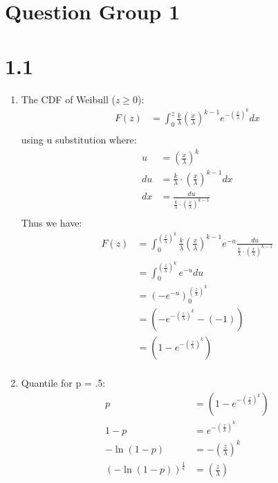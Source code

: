 \documentclass{article}
\title{\thetitle}
\author{\theauthor}
\begin{document}
\maketitle

\section*{Question Group 1}
\section*{1.1}
\begin{enumerate}
\item The CDF of Weibull ($z \geq 0$): \\
\begin{align*}
F(z) &= \int_0^{z}\frac{k}{\lambda} (\frac{x}{\lambda})^{k-1}e^{-(\frac{x}{\lambda})^k} dx\\
\end{align*}
using u substitution where: 
\begin{align*}
u &= (\frac{x}{\lambda})^k \\
du &= \frac{k}{\lambda} \cdot (\frac{x}{\lambda})^{k-1}dx \\
dx &= \frac{du}{\frac{k}{\lambda} \cdot (\frac{x}{\lambda})^{k-1}} \\
\end{align*}
Thus we have: \\
\begin{align*}
F(z) &= \int_0^{(\frac{z}{\lambda})^k}\frac{k}{\lambda} (\frac{x}{\lambda})^{k-1}e^{-u}  \frac{du}{\frac{k}{\lambda} \cdot (\frac{x}{\lambda})^{k-1}}\\
&= \int_0^{ (\frac{z}{\lambda})^k} e^{-u} du \\
&= (-e^{-u})_0^{ (\frac{z}{\lambda})^k} \\
&= (-e^{-(\frac{z}{\lambda})^k} - (-1)) \\
&= (1 - e^{-(\frac{z}{\lambda})^k}) \\
\end{align*}
\item Quantile for p = .5: \\
\begin{align*}
p &= (1 - e^{-(\frac{z}{\lambda})^k}) \\
1 - p &= e^{-(\frac{z}{\lambda})^k} \\
-\ln(1 - p) &= -(\frac{z}{\lambda})^k \\
(-\ln(1 - p))^{\frac{1}{k}} &= (\frac{z}{\lambda}) \\

\end{align*}
\end{enumerate}
\end{document}
